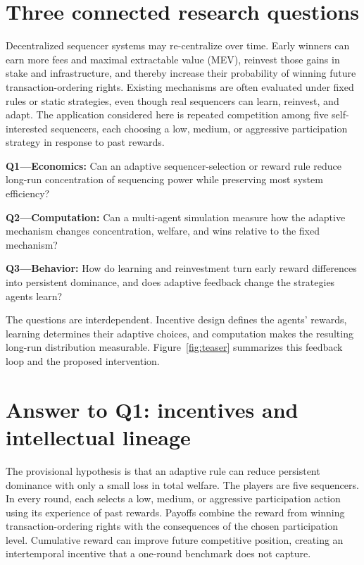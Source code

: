 \section{Three connected research questions}
Decentralized sequencer systems may re-centralize over time. Early winners can earn more fees and maximal extractable value (MEV), reinvest those gains in stake and infrastructure, and thereby increase their probability of winning future transaction-ordering rights. Existing mechanisms are often evaluated under fixed rules or static strategies, even though real sequencers can learn, reinvest, and adapt. The application considered here is repeated competition among five self-interested sequencers, each choosing a low, medium, or aggressive participation strategy in response to past rewards.

\noindent\textbf{Q1---Economics:} Can an adaptive sequencer-selection or reward rule reduce long-run concentration of sequencing power while preserving most system efficiency?\par
\noindent\textbf{Q2---Computation:} Can a multi-agent simulation measure how the adaptive mechanism changes concentration, welfare, and wins relative to the fixed mechanism?\par
\noindent\textbf{Q3---Behavior:} How do learning and reinvestment turn early reward differences into persistent dominance, and does adaptive feedback change the strategies agents learn?

The questions are interdependent. Incentive design defines the agents' rewards, learning determines their adaptive choices, and computation makes the resulting long-run distribution measurable. Figure~\ref{fig:teaser} summarizes this feedback loop and the proposed intervention.

\section{Answer to Q1: incentives and intellectual lineage}
The provisional hypothesis is that an adaptive rule can reduce persistent dominance with only a small loss in total welfare. The players are five sequencers. In every round, each selects a low, medium, or aggressive participation action using its experience of past rewards. Payoffs combine the reward from winning transaction-ordering rights with the consequences of the chosen participation level. Cumulative reward can improve future competitive position, creating an intertemporal incentive that a one-round benchmark does not capture.

